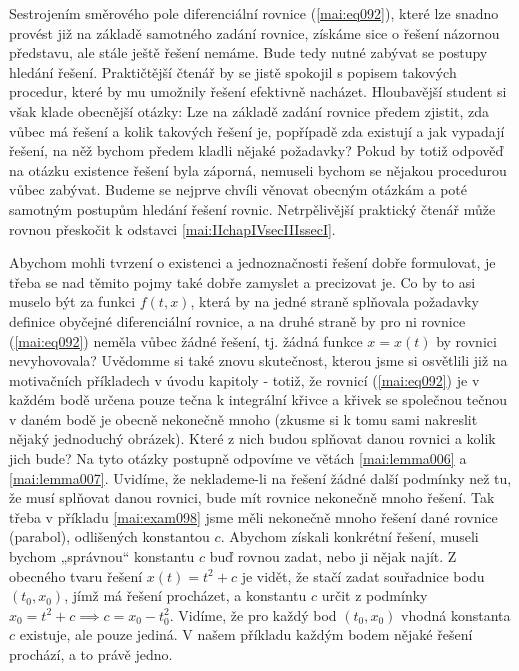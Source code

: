       

      Sestrojením směrového pole diferenciální rovnice (\ref{mai:eq092}), které lze snadno provést
      již na základě samotného zadání rovnice, získáme sice o řešení názornou představu, ale stále
      ještě řešení nemáme. Bude tedy nutné zabývat se postupy hledání řešení. Praktičtější čtenář by
      se jistě spokojil s popisem takových procedur, které by mu umožnily řešení efektivně nacházet.
      Hloubavější student si však klade obecnější otázky: Lze na základě zadání rovnice předem
      zjistit, zda vůbec má řešení a kolik takových řešení je, popřípadě zda existují a jak vypadají
      řešení, na něž bychom předem kladli nějaké požadavky? Pokud by totiž odpověď na otázku
      existence řešení byla záporná, nemuseli bychom se nějakou procedurou vůbec zabývat. Budeme se
      nejprve chvíli věnovat obecným otázkám a poté samotným postupům hledání řešení rovnic.
      Netrpělivější praktický čtenář může rovnou přeskočit k odstavci \ref{mai:IIchapIVsecIIIssecI}.

      Abychom mohli tvrzení o existenci a jednoznačnosti řešení dobře formulovat, je třeba se nad
      těmito pojmy také dobře zamyslet a precizovat je. Co by to asi muselo být za funkci \(f(t,
      x)\), která by na jedné straně splňovala požadavky definice obyčejné diferenciální rovnice, a
      na druhé straně by pro ni rovnice (\ref{mai:eq092}) neměla vůbec žádné řešení, tj. žádná
      funkce \(x = x(t)\) by rovnici nevyhovovala? Uvědomme si také znovu skutečnost, kterou jsme si
      osvětlili již na motivačních příkladech v úvodu kapitoly - totiž, že rovnicí (\ref{mai:eq092})
      je v každém bodě určena pouze tečna k integrální křivce a křivek se společnou tečnou v daném
      bodě je obecně nekonečně mnoho (zkusme si k tomu sami nakreslit nějaký jednoduchý obrázek).
      Které z nich budou splňovat danou rovnici a kolik jich bude? Na tyto otázky postupně odpovíme
      ve větách \ref{mai:lemma006} a \ref{mai:lemma007}. Uvidíme, že neklademe-li na řešení žádné
      další podmínky než tu, že musí splňovat danou rovnici, bude mít rovnice nekonečně mnoho
      řešení. Tak třeba v příkladu \ref{mai:exam098} jsme měli nekonečně mnoho řešení dané rovnice
      (parabol), odlišených konstantou \(c\). Abychom získali konkrétní řešení, museli bychom
      „správnou“ konstantu \(c\) buď rovnou zadat, nebo ji nějak najít. Z obecného tvaru řešení
      \(x(t) = t^2 + c\) je vidět, že stačí zadat souřadnice bodu \((t_0, x_0)\), jímž má řešení
      procházet, a konstantu \(c\) určit z podmínky \(x_0 = t^2 + c \implies c = x_0 - t_0^2\).
      Vidíme, že pro každý bod \((t_0, x_0)\) vhodná konstanta \(c\) existuje, ale pouze jediná. V
      našem příkladu každým bodem nějaké řešení prochází, a to právě jedno.

